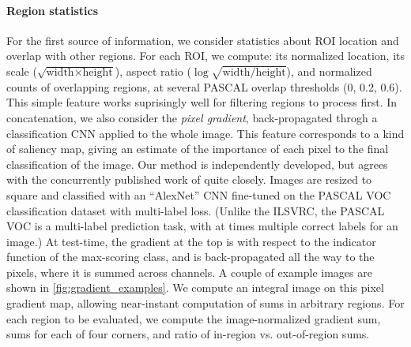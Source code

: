 \paragraph{Region statistics}\label{sec:region}
For the first source of information, we consider statistics about ROI location and overlap with other regions.
For each ROI, we compute: its normalized location, its scale ($\sqrt{\text{width} \times \text{height}}$), aspect ratio ($\log \sqrt{\text{width} / \text{height}}$), and normalized counts of overlapping regions, at several PASCAL overlap thresholds (0, 0.2, 0.6).
This simple feature works suprisingly well for filtering regions to process first.
In concatenation, we also consider the \emph{pixel gradient}, back-propagated throgh a classification CNN applied to the whole image.
This feature corresponds to a kind of saliency map, giving an estimate of the importance of each pixel to the final classification of the image.
Our method is independently developed, but agrees with the concurrently published work of \cite{Simonyan-ICLR-2014} quite closely.
Images are resized to square and classified with an ``AlexNet'' \cite{Krizhevsky-NIPS-2012} CNN fine-tuned on the PASCAL VOC classification dataset with multi-label loss.
(Unlike the ILSVRC, the PASCAL VOC is a multi-label prediction task, with at times multiple correct labels for an image.)
At test-time, the gradient at the top is with respect to the indicator function of the max-scoring class, and is back-propagated all the way to the pixels, where it is summed across channels.
A couple of example images are shown in \autoref{fig:gradient_examples}.
We compute an integral image on this pixel gradient map, allowing near-instant computation of sums in arbitrary regions.
For each region to be evaluated, we compute the image-normalized gradient sum, sums for each of four corners, and ratio of in-region vs. out-of-region sums.

